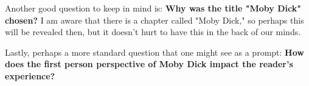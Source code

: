 Another good question to keep in mind is: \textbf{Why was the title "Moby Dick"
chosen?} I am aware that there is a chapter called "Moby Dick," so perhaps this
will be revealed then, but it doesn't hurt to have this in the back of our
minds.

Lastly, perhaps a more standard question that one might see as a prompt:
\textbf{How does the first person perspective of Moby Dick impact the reader's
experience?}
